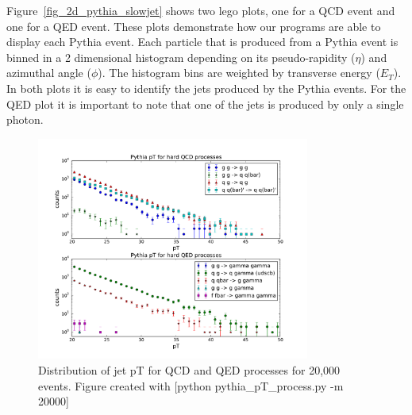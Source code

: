 \documentclass[11pt]{article}
\begin{document}
Figure~\ref{fig_2d_pythia_slowjet} shows two lego plots, one for a QCD event and one for a QED event. These plots demonstrate how our programs are able to display each Pythia event. Each particle that is produced from a Pythia event is binned in a 2 dimensional histogram depending on its pseudo-rapidity ($\eta$) and azimuthal angle ($\phi$). The histogram bins are weighted by transverse energy ($E_T$). In both plots it is easy to identify the jets produced by the Pythia events. For the QED plot it is important to note that one of the jets is produced by only a single photon. 

\begin{figure}[h]
\begin{center}
\includegraphics[width=0.8\textwidth]{pythia_pT_process.pdf}
\caption{Distribution of jet pT for QCD and QED processes for 20,000 events.  Figure created with [python pythia\_pT\_process.py -m 20000]}
\label{fig_pythia_pT_process}
\end{center}
\end{figure}
\end{document}
